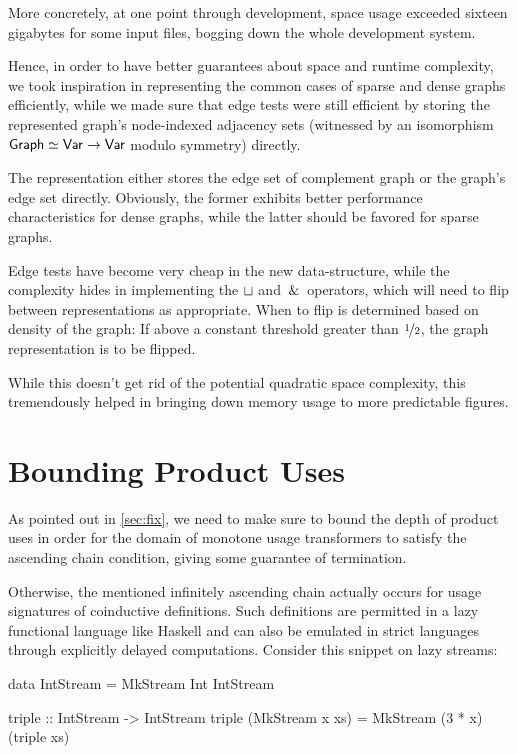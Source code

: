 More concretely, at one point through development, space usage exceeded sixteen gigabytes for some input files, bogging down the whole development system.

Hence, in order to have better guarantees about space and runtime complexity, we took inspiration in representing the common cases of sparse and dense graphs efficiently, while we made sure that edge tests were still efficient by storing the represented graph's node-indexed adjacency sets (witnessed by an isomorphism $\text{\textsf{Graph}} \simeq \text{\textsf{Var}} \to \text{\textsf{Var}}$ modulo symmetry) directly.

The representation either stores the edge set of complement graph or the graph's edge set directly.
Obviously, the former exhibits better performance characteristics for dense graphs, while the latter should be favored for sparse graphs.

Edge tests have become very cheap in the new data-structure, while the complexity hides in implementing the $\sqcup$ and $\,\&\,$ operators, which will need to flip between representations as appropriate.
When to flip is determined based on density of the graph:
If above a constant threshold greater than $\nicefrac{1}{2}$, the graph representation is to be flipped.

While this doesn't get rid of the potential quadratic space complexity, this tremendously helped in bringing down memory usage to more predictable figures.

\section{Bounding Product Uses}\label{sec:bound}

As pointed out in \cref{sec:fix}, we need to make sure to bound the depth of product uses in order for the domain of monotone usage transformers to satisfy the ascending chain condition, giving some guarantee of termination.

Otherwise, the mentioned infinitely ascending chain actually occurs for usage signatures of coinductive definitions. 
Such definitions are permitted in a lazy functional language like Haskell and can also be emulated in strict languages through explicitly delayed computations. 
Consider this snippet on lazy streams:

\begin{haskellcode}
  data IntStream = MkStream Int IntStream

  triple :: IntStream -> IntStream
  triple (MkStream x xs) = MkStream (3 * x) (triple xs)
\end{haskellcode}

